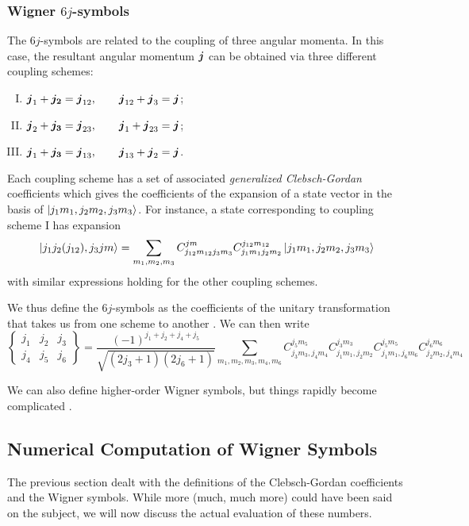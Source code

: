 \subsubsection{Wigner $6j$-symbols}
The $6j$-symbols are related to the coupling of three angular momenta. In
this case, the resultant angular momentum $\boldsymbol{j}$ can be obtained via three 
different coupling schemes:
  \begin{enumerate}[I.]
   \item $\boldsymbol{j}_1+\boldsymbol{j_2}=\boldsymbol{j}_{12}, \qquad \boldsymbol{j}_{12}+\boldsymbol{j}_3=\boldsymbol{j}$;
   \item $\boldsymbol{j}_2+\boldsymbol{j_3}=\boldsymbol{j}_{23}, \qquad \boldsymbol{j}_1+\boldsymbol{j}_{23}=\boldsymbol{j}$;
   \item $\boldsymbol{j}_1+\boldsymbol{j_3}=\boldsymbol{j}_{13}, \qquad \boldsymbol{j}_{13}+\boldsymbol{j}_2=\boldsymbol{j}$.
  \end{enumerate}
Each coupling scheme has a set of associated \textit{generalized Clebsch-Gordan}
coefficients which gives the coefficients of the expansion of a state vector
in the basis of $\ket{j_1m_1,j_2m_2,j_3m_3}$. For instance, a state 
corresponding to coupling scheme I has expansion
  \begin{equation}
   \ket{j_1j_2(j_{12}),j_3jm} = \sum_{m_1,m_2,m_3}C_{j_{12}m_{12}j_3m_3}^{jm}C_{j_1m_1j_2m_2}^{j_{12}m_{12}}\ket{j_1m_1,j_2m_2,j_3m_3}
  \end{equation}
with similar expressions holding for the other coupling schemes.

We thus define the $6j$-symbols as the coefficients of the unitary
transformation that takes us from one scheme to another \cite{VAR1988}.
We can then write
  \begin{equation}
   \begin{Bmatrix} j_1 & j_2 & j_3 \\ j_4 & j_5 & j_6 \end{Bmatrix} = \frac{(-1)^{j_1+j_2+j_4+j_5}}{\sqrt{(2j_3+1)(2j_6+1)}}
      \sum_{m_1,m_2,m_3,m_4,m_6} C_{j_3m_3,j_4m_4}^{j_5m_5}C_{j_1m_1,j_2m_2}^{j_3m_3}C_{j_1m_1,j_6m_6}^{j_5m_5}C_{j_2m_2,j_4m_4}^{j_6m_6}
  \end{equation}


We can also define higher-order Wigner symbols, but things rapidly become complicated \cite{YUT1962}. 

\subsection{Numerical Computation of Wigner Symbols}
The previous section dealt with the definitions of 
the Clebsch-Gordan coefficients and the Wigner symbols. 
While more (much, much more) could have been said on the
subject, we will now discuss the actual evaluation of these
numbers. 

